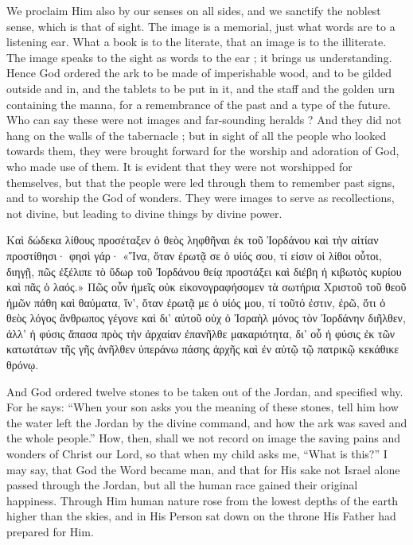 \documentclass[10pt]{book}
\newcommand{\switchGreek}[1][]{\selectlanguage{polutonikogreek} \switchcolumn*[#1]}
\newcommand{\switchEnglish}{\selectlanguage{english} \switchcolumn}
\begin{document}
\begin{paracol}{2}
We proclaim Him also by our senses on all 
sides, and we sanctify the noblest sense, which 
is that of sight. The image is a memorial, just 
what words are to a listening ear. What a 
book is to the literate, that an image is to the 
illiterate. The image speaks to the sight as 
words to the ear ; it brings us understanding. 
Hence God ordered the ark to be made of 
imperishable wood, and to be gilded outside 
and in, and the tablets to be put in it, and the 
staff and the golden urn containing the manna, 
for a remembrance of the past and a type of the 
future. Who can say these were not images 
and far-sounding heralds ? And they did not 
hang on the walls of the tabernacle ; but in 
sight of all the people who looked towards 
them, they were brought forward for the 
worship and adoration of God, who made 
use of them. It is evident that they were not 
worshipped for themselves, but that the people 
were led through them to remember past signs, 
and to worship the God of wonders. They 
were images to serve as recollections, not divine, 
but leading to divine things by divine power. 

\switchGreek

Καὶ δώδεκα λίθους προσέταξεν ὁ θεὸς ληφθῆναι ἐκ τοῦ Ἰορδάνου καὶ τὴν αἰτίαν προστίθησι· φησὶ γάρ· «Ἵνα, ὅταν ἐρωτᾷ σε ὁ υἱός σου, τί εἰσιν οἱ λίθοι οὗτοι, διηγῇ, πῶς ἐξέλιπε τὸ ὕδωρ τοῦ Ἰορδάνου θείᾳ προστάξει καὶ διέβη ἡ κιβωτὸς κυρίου καὶ πᾶς ὁ λαός.» Πῶς οὖν ἡμεῖς οὐκ εἰκονογραφήσομεν τὰ σωτήρια Χριστοῦ τοῦ θεοῦ ἡμῶν πάθη καὶ θαύματα, ἵν’, ὅταν ἐρωτᾷ με ὁ υἱός μου, τί τοῦτό ἐστιν, ἐρῶ, ὅτι ὁ θεὸς λόγος ἄνθρωπος γέγονε καὶ δι’ αὐτοῦ οὐχ ὁ Ἰσραὴλ μόνος τὸν Ἰορδάνην διῆλθεν, ἀλλ’ ἡ φύσις ἅπασα πρὸς τὴν ἀρχαίαν ἐπανῆλθε μακαριότητα, δι’ οὗ ἡ φύσις ἐκ τῶν κατωτάτων τῆς γῆς ἀνῆλθεν ὑπεράνω πάσης ἀρχῆς καὶ ἐν αὐτῷ τῷ πατρικῷ κεκάθικε θρόνῳ.

\switchEnglish

And God ordered twelve stones to be taken 
out of the Jordan, and specified why. For he 
says: ``When your son asks you the meaning 
of these stones, tell him how the water left the 
Jordan by the divine command, and how the 
ark was saved and the whole people.'' How, 
then, shall we not record on image the saving 
pains and wonders of Christ our Lord, so that 
when my child asks me, ``What is this?'' I 
may say, that God the Word became man, and 
that for His sake not Israel alone passed 
through the Jordan, but all the human race 
gained their original happiness. Through 
Him human nature rose from the lowest 
depths of the earth higher than the skies, and 
in His Person sat down on the throne His 
Father had prepared for Him. 


\end{paracol}
\end{document}
